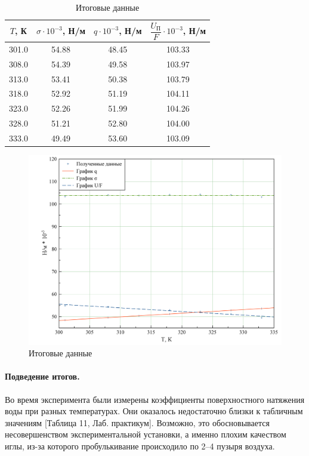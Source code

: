 \documentclass{letnab}
\begin{document}
\begin{table}[H]
	\centering
	\caption{Итоговые данные}
	\begin{tabular}{c|ccc}
		\toprule
		$T$, К & $\sigma \cdot 10^{-3}$, Н/м & $q \cdot 10^{-3}$, Н/м & $\dfrac{U_\text{П}}{F} \cdot 10^{-3}$, Н/м \\\midrule
		301.0  & 54.88                       & 48.45                  & 103.33                                     \\
		308.0  & 54.39                       & 49.58                  & 103.97                                     \\
		313.0  & 53.41                       & 50.38                  & 103.79                                     \\
		318.0  & 52.92                       & 51.19                  & 104.11                                     \\
		323.0  & 52.26                       & 51.99                  & 104.26                                     \\
		328.0  & 51.21                       & 52.80                  & 104.00                                     \\
		333.0  & 49.49                       & 53.60                  & 103.09                                    \\ \bottomrule
		
	\end{tabular}
\end{table} 
\begin{figure}[H]
	\includegraphics[width = 150mm]{Graph.png}
	\caption{Итоговые данные}
\end{figure}
\paragraph{Подведение итогов.}
Во время эксперимента были измерены коэффициенты поверхностного натяжения воды при разных температурах. Они оказалось недостаточно близки к табличным значениям [Таблица 11, Лаб. практикум]. Возможно, это обосновывается несовершенством экспериментальной установки, а именно плохим качеством иглы, из-за которого пробулькивание происходило по 2--4 пузыря воздуха.
\end{document}
